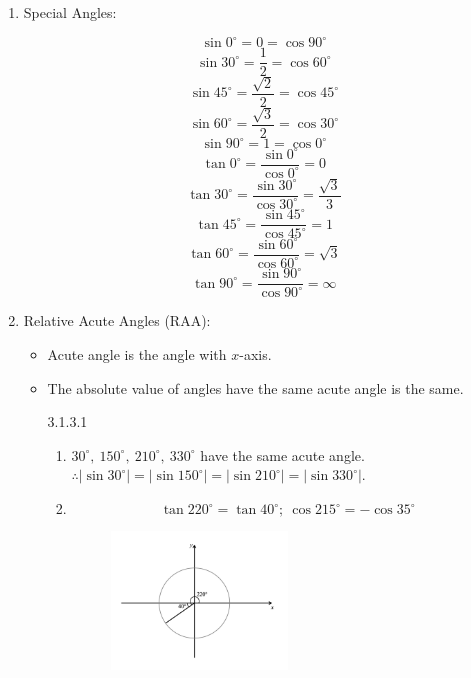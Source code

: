 \documentclass[12pt, a4paper]{article}
\begin{document}
\begin{enumerate}
\begin{itemize}
\begin{figure}[H]
    \end{figure}
  \end{itemize}
  \item Special Angles: 
  \begin{multicols}{2}
    $$\sin0^\circ=0=\cos90^\circ$$
    $$\sin30^\circ=\frac{1}{2}=\cos60^\circ$$
    $$\sin45^\circ=\frac{\sqrt{2}}{2}=\cos45^\circ$$
    $$\sin60^\circ=\frac{\sqrt{3}}{2}=\cos30^\circ$$
    $$\sin90^\circ=1=\cos0^\circ$$
    $$\tan0^\circ=\frac{\sin0^\circ}{\cos0^\circ}=0$$
    $$\tan30^\circ=\frac{\sin30^\circ}{\cos30^\circ}=\frac{\sqrt{3}}{3}$$
    $$\tan45^\circ=\frac{\sin45^\circ}{\cos45^\circ}=1$$
    $$\tan60^\circ=\frac{\sin60^\circ}{\cos60^\circ}=\sqrt{3}$$
    $$\tan90^\circ=\frac{\sin90^\circ}{\cos90^\circ}=\infty$$
  \end{multicols}
  \item Relative Acute Angles (RAA): 
  \begin{itemize}
    \item Acute angle is the angle with $x$-axis.
    \item The absolute value of angles have the same acute angle is the same. 
    \begin{example}{3.1.3.1}{}
      \begin{enumerate}
        \item $30^\circ,\ 150^\circ,\ 210^\circ,\ 330^\circ$ have the same acute angle. \\
        $\therefore \left|\sin30^\circ\right|=\left|\sin150^\circ\right|=\left|\sin210^\circ\right|=\left|\sin330^\circ\right|.$
        \item $$\tan220^\circ=\tan40^\circ;\ \cos215^\circ=-\cos35^\circ$$
        \begin{figure}[H]
          \centering
          \includegraphics[width=0.5\textwidth]{Fig.3.24.jpg}
        \end{figure}
      \end{enumerate}
    \end{example}
  \end{itemize}
\end{enumerate}
\end{document}
